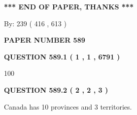 \documentclass[12pt]{article}
\begin{document}
 
   
   
 \vspace{0.2in}
 
   
   
   
   
\vspace{1.0in} 
{\textbf{\large{ *** END OF PAPER, THANKS *** }}} 
   
   
\hspace{1.0in} By: 
 239 ( 416 ,  613 )
   
   
   
   
\newpage 
\setcounter{page}{ 
   589001 } 
   
   
   
   
 {\textbf{ \Large{ PAPER NUMBER  589  }}}
   
   
\vspace{0.2in}
   
   
   
   
   
   
 \vspace{0.2in}
 
 
 
 
   
   
  
\vspace{0.2in}
  
{\textbf{\Large{QUESTION
589.1 
 ( 1 , 1 , 6791 )
}}}
  
  
 
 
\noindent{}

100
 
 
  
\vspace{0.2in}
  
{\textbf{\Large{QUESTION
589.2 
 ( 2 , 2 , 3 )
}}}
  
  
 
 
\noindent{}
 
 
Canada has 10  provinces and 3 territories.
 
 
 
 
   
   
 \vspace{0.2in}
 
   
   
   
   
\end{document}
